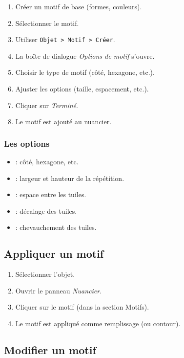 \begin{enumerate}
    \item Créer un motif de base (formes, couleurs).
    \item Sélectionner le motif.
    \item Utiliser \texttt{Objet > Motif > Créer}.
    \item La boîte de dialogue \emph{Options de motif} s'ouvre.
    \item Choisir le type de motif (côté, hexagone, etc.).
    \item Ajuster les options (taille, espacement, etc.).
    \item Cliquer sur \emph{Terminé}.
    \item Le motif est ajouté au nuancier.
\end{enumerate}

\subsubsection{Les options}

\begin{itemize}
    \item {} : côté, hexagone, etc.
    \item {} : largeur et hauteur de la répétition.
    \item {} : espace entre les tuiles.
    \item {} : décalage des tuiles.
    \item {} : chevauchement des tuiles.
\end{itemize}

\subsection{Appliquer un motif}

\begin{enumerate}
    \item Sélectionner l'objet.
    \item Ouvrir le panneau \emph{Nuancier}.
    \item Cliquer sur le motif (dans la section Motifs).
    \item Le motif est appliqué comme remplissage (ou contour).
\end{enumerate}

\subsection{Modifier un motif}

